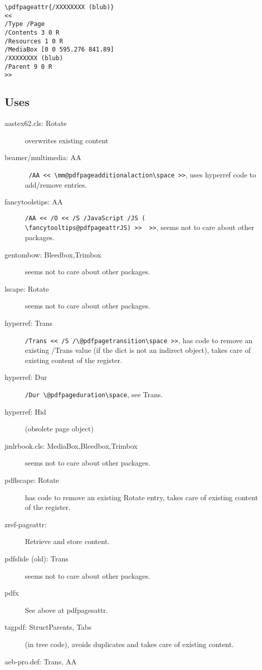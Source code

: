 \documentclass{article}
\begin{document}
\begin{verbatim}
\pdfpageattr{/XXXXXXXX (blub)}
<<
/Type /Page
/Contents 3 0 R
/Resources 1 0 R
/MediaBox [0 0 595.276 841.89]
/XXXXXXXX (blub)
/Parent 9 0 R
>>
\end{verbatim}

\subsection{Uses}
\begin{description}
  \item[aastex62.cls: Rotate] overwrites existing content
  \item[beamer/multimedia: AA] \verb+ /AA << \mm@pdfpageadditionalaction\space >>+, uses hyperref code to add/remove entries.
  \item[fancytoolstips: AA] \verb+/AA << /O << /S /JavaScript /JS (    \fancytooltips@pdfpageattrJS) >>  >>+, seems not to care about other packages.

  \item[gentombow: Bleedbox,Trimbox] seems not to care about other packages.
  \item[lscape: Rotate] seems not to care about other packages.
  \item[hyperref: Trans] \verb+/Trans << /S /\@pdfpagetransition\space >>+, has code to remove an existing /Trans value (if the dict is not an indirect object), takes care of existing content of the register.

  \item[hyperref: Dur] \verb+/Dur \@pdfpageduration\space+, see Trans.
  \item[hyperref: Hid] (obsolete page object)
  \item[jmlrbook.cls: MediaBox,Bleedbox,Trimbox] seems not to care about other packages.
  \item[pdflscape: Rotate] has code to remove an existing Rotate entry, takes care of existing content of the register.
  \item[zref-pageattr:] Retrieve and store content.
  \item[pdfslide (old): Trans]  seems not to care about other packages.
  \item[pdfx] See above at pdfpagesattr.
  \item[tagpdf: StructParents, Tabs] (in tree code), avoids duplicates and takes care of existing content.
  \item[aeb-pro.def: Trans, AA] 
\end{description}
\end{document}
